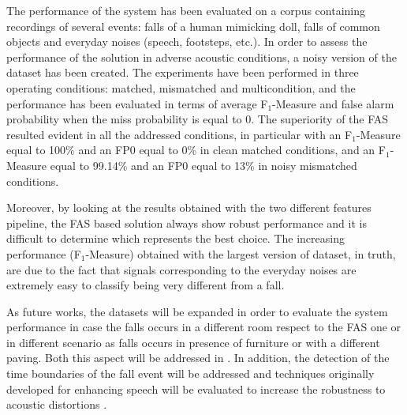 The performance of the system has been evaluated on a corpus containing recordings of several events: falls of a human mimicking doll, falls of common objects and everyday noises (speech, footsteps, etc.). In order to assess the performance of the solution in adverse acoustic conditions, a noisy version of the dataset has been created. The experiments have been performed in three operating conditions: matched, mismatched and multicondition, and the performance has been evaluated in terms of average F$_1$-Measure and false alarm probability when the miss probability is equal to 0. The superiority of the FAS resulted evident in all the addressed conditions, in particular with an F$_1$-Measure equal to 100\%  and an FP0 equal to 0\% in clean matched conditions, and an F$_1$-Measure equal to 99.14\% and an FP0 equal to 13\% in noisy mismatched conditions.

Moreover, by looking at the results obtained with the two different features pipeline, the FAS based solution always show robust performance and it is difficult to determine which represents the best choice. 
The increasing performance (F$_1$-Measure) obtained with the largest version of dataset, in truth, are due to the fact that signals corresponding to the everyday noises are extremely easy to classify 
being very different from a fall.

As future works, the datasets will be expanded in order to evaluate the system performance in case the falls occurs in a different room respect to the FAS one or in different scenario as falls occurs in presence of furniture or with a different paving. Both this aspect will be addressed in . In addition, the detection of the time boundaries of the fall event will be addressed and techniques originally developed for enhancing speech will be evaluated to increase the robustness to acoustic distortions \cite{Rotili08,Cifani2008}.